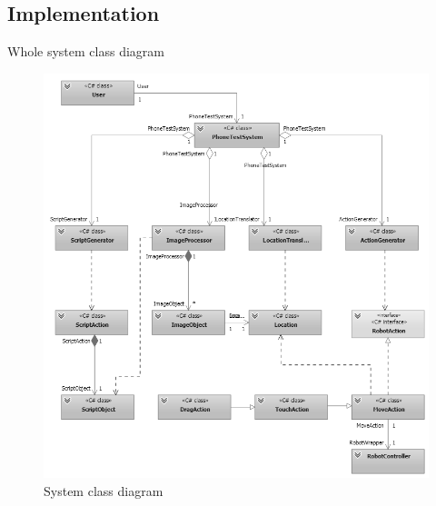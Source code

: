 \subsection{Implementation}
Whole system class diagram
    \begin{figure}[H]
		\centering
		\includegraphics[scale=0.55]{Chapters/Fig/class_diagram.png}
		\caption{System class diagram}
		\label{fig:class_diagram}
	\end{figure}

